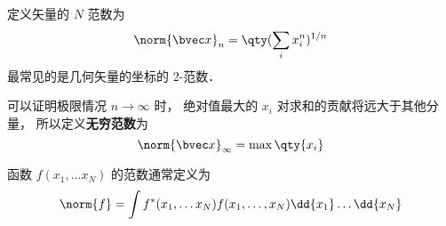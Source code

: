 
定义矢量的 $N$ 范数为
\begin{equation}
\norm{\bvec x}_n = \qty(\sum_i x_i^n)^{1/n}
\end{equation}
最常见的是几何矢量的坐标的 2-范数．


可以证明极限情况 $n \to \infty$ 时， 绝对值最大的 $x_i$ 对求和的贡献将远大于其他分量， 所以定义\textbf{无穷范数}为
\begin{equation}
\norm{\bvec x}_\infty = \max \qty{x_i}
\end{equation}

函数 $f(x_1, \dots x_N)$ 的范数通常定义为
\begin{equation}
\norm{f} = \int f^*(x_1, \dots x_N) f(x_1, \dots, x_N) \dd{x_1}\dots \dd{x_N}
\end{equation}
